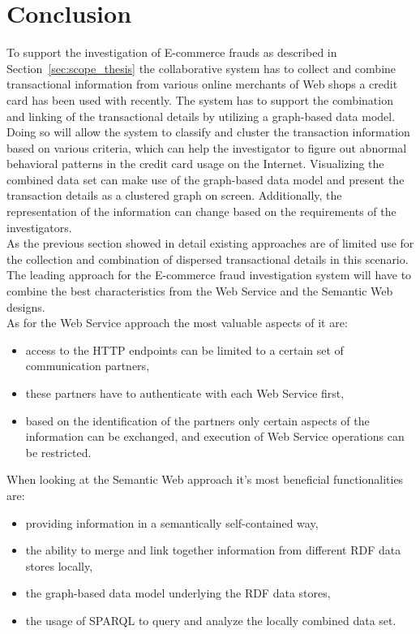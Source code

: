 
\section{Conclusion}
\label{sec:concept_conclusion}

To support the investigation of \gls{E-commerce} frauds as described in Section~\ref{sec:scope_thesis} the collaborative system has to collect and combine transactional information from various online merchants of Web shops a credit card has been used with recently. The system has to support the combination and linking of the transactional details by utilizing a graph-based data model. Doing so will allow the system to classify and cluster the transaction information based on various criteria, which can help the investigator to figure out abnormal behavioral patterns in the credit card usage on the Internet. Visualizing the combined data set can make use of the graph-based data model and present the transaction details as a clustered graph on screen. Additionally, the representation of the information can change based on the requirements of the investigators. \\

As the previous section showed in detail existing approaches are of limited use for the collection and combination of dispersed transactional details in this scenario. The leading approach for the \gls{E-commerce} fraud investigation system will have to combine the best characteristics from the Web Service and the Semantic Web designs. \\

As for the Web Service approach the most valuable aspects of it are: \@

\begin{itemize}
	\item access to the \gls{HTTP} endpoints can be limited to a certain set of communication partners,
	\item these partners have to authenticate with each Web Service first,
	\item based on the identification of the partners only certain aspects of the information can be exchanged, and execution of Web Service operations can be restricted.
\end{itemize}

When looking at the Semantic Web approach it's most beneficial functionalities are: \@

\begin{itemize}
	\item providing information in a semantically self-contained way,
	\item the ability to merge and link together information from different \gls{RDF} data stores locally,
	\item the graph-based data model underlying the \gls{RDF} data stores,
	\item the usage of \gls{SPARQL} to query and analyze the locally combined data set.
\end{itemize}

